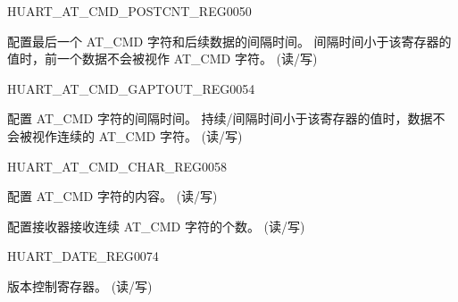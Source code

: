 \begin{register}{H}{UART\_AT\_CMD\_POSTCNT\_REG}{\hexprefix{}0050}\label{regdesc:UARTATCMDPOSTCNTREG}
%
%
\regnewline%
\begin{regdesc}\begin{reglist}
\label{fielddesc:UARTPOSTIDLENUM}\item [UART\_POST\_IDLE\_NUM] 配置最后一个 AT\_CMD 字符和后续数据的间隔时间。
间隔时间小于该寄存器的值时，前一个数据不会被视作 AT\_CMD 字符。 (读/写)
\end{reglist}\end{regdesc}
\end{register}


\begin{register}{H}{UART\_AT\_CMD\_GAPTOUT\_REG}{\hexprefix{}0054}\label{regdesc:UARTATCMDGAPTOUTREG}
%
%
\regnewline%
\begin{regdesc}\begin{reglist}
\label{fielddesc:UARTRXGAPTOUT}\item [UART\_RX\_GAP\_TOUT] 配置 AT\_CMD 字符的间隔时间。
持续/间隔时间小于该寄存器的值时，数据不会被视作连续的 AT\_CMD 字符。 (读/写)
\end{reglist}\end{regdesc}
\end{register}


\begin{register}{H}{UART\_AT\_CMD\_CHAR\_REG}{\hexprefix{}0058}\label{regdesc:UARTATCMDCHARREG}
%
%
%
\regnewline%
\begin{regdesc}\begin{reglist}
\label{fielddesc:UARTATCMDCHAR}\item [UART\_AT\_CMD\_CHAR] 配置 AT\_CMD 字符的内容。 (读/写)
\label{fielddesc:UARTCHARNUM}\item [UART\_CHAR\_NUM] 配置接收器接收连续 AT\_CMD 字符的个数。 (读/写)
\end{reglist}\end{regdesc}
\end{register}


\begin{register}{H}{UART\_DATE\_REG}{\hexprefix{}0074}\label{regdesc:UARTDATEREG}
%
\regnewline%
\begin{regdesc}\begin{reglist}
\label{fielddesc:UARTDATE}\item [UART\_DATE] 版本控制寄存器。 (读/写)
\end{reglist}\end{regdesc}
\end{register}
